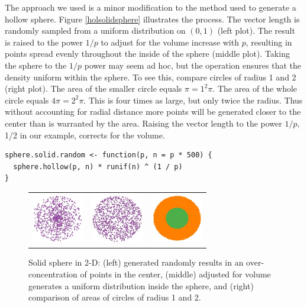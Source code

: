 The approach we used is a minor modification to the method used to
generate a hollow sphere. Figure \ref{holsolidsphere} illustrates the
process. The vector length is randomly sampled from a uniform
distribution on $(0,1)$ (left plot). The result is raised to the power
$1/p$ to adjust for the volume increase with $p$, resulting in points
spread evenly throughout the inside of the sphere (middle plot).
Taking the sphere to the $1/p$ power may seem ad hoc, but the
operation ensures that the density uniform within the sphere. To see
this, compare circles of radius 1 and 2 (right plot).  The area of the
smaller circle equals $\pi =  1^2\pi $.  The area of the whole
circle equals $ 4 \pi = 2^2 \pi $. This is four times as large, but
only twice the radius.  Thus without accounting for radial distance
more points will be generated closer to the center than is warranted
by the area.  Raising the vector length to the power $1/p$, 1/2 in our
example, corrects for the volume.

\begin{verbatim}
sphere.solid.random <- function(p, n = p * 500) {
  sphere.hollow(p, n) * runif(n) ^ (1 / p)
}
\end{verbatim}

\begin{figure}[ht]
\centering
\begin{tabular}{c c c}
\includegraphics[width=0.9in]{fig/sphere-2-bad.jpg}
&\includegraphics[width=0.9in]{fig/sphere-2-good.jpg}
&\includegraphics[width=0.9in]{fig/sphere-2-1and2.jpg}
\end{tabular}
\caption{Solid sphere in 2-D: (left) generated randomly results in an
  over-concentration of points in the center, (middle) adjusted for
  volume generates a uniform distribution inside the sphere, and
  (right) comparison of areas of circles of radius 1 and 2.}
\label{cfb}
\end{figure}

